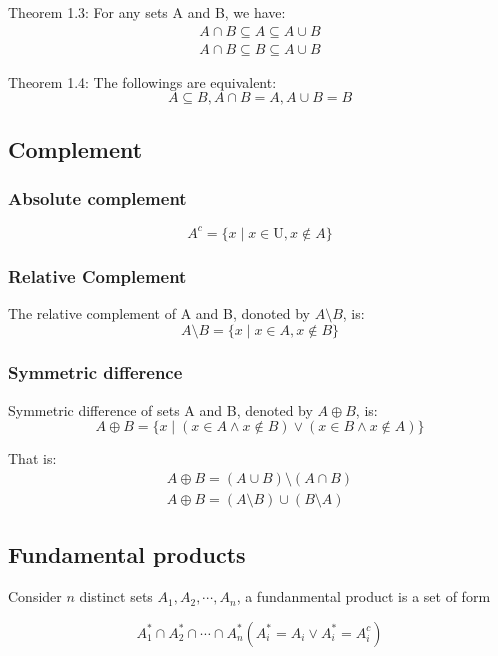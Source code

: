 \documentclass{article}
\begin{document}
Theorem 1.3: For any sets A and B, we have:
\begin{gather*}
A \cap B \subseteq A \subseteq A \cup B \\
A \cap B \subseteq B \subseteq A \cup B
\end{gather*}

Theorem 1.4: The followings are equivalent:
$$
A \subseteq B, A \cap B = A, A \cup B = B
$$

\subsection{Complement}

\subsubsection{Absolute complement}

$$
A^c = \{ x \mid x \in \text{U}, x \not\in A \}
$$

\subsubsection{Relative Complement}

The relative complement of A and B, donoted by $A\setminus B$, is:
$$
A\setminus B = \{ x \mid x \in A, x \not\in B \}
$$

\subsubsection{Symmetric difference}

Symmetric difference of sets A and B, denoted by $A \oplus B$, is:
$$
A \oplus B = \{ x \mid (x \in A \land x \not\in B) \lor (x \in B \land x \not\in A) \}
$$

That is:
\begin{gather*}
A \oplus B = (A \cup B)\setminus(A \cap B) \\
A \oplus B = (A \setminus B) \cup (B \setminus A)
\end{gather*}

\subsection{Fundamental products}

Consider $n$ distinct sets $A_1, A_2, \cdots, A_n$,
a fundanmental product is a set of form

$$
A_1^* \cap A_2^* \cap \cdots \cap A_n^* (A_i^* = A_i \lor A_i^* = A_i^c)
$$
\end{document}
